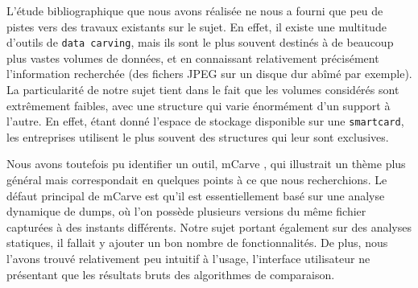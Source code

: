 L'étude bibliographique que nous avons réalisée ne nous a fourni que peu de pistes vers des travaux existants sur le sujet. En effet, il existe une multitude d'outils de \texttt{data carving}, mais ils sont le plus souvent destinés à de beaucoup plus vastes volumes de données, et en connaissant relativement précisément l'information recherchée (des fichers JPEG sur un disque dur abîmé par exemple). La particularité de notre sujet tient dans le fait que les volumes considérés sont extrêmement faibles, avec une structure qui varie énormément d'un support à l'autre. En effet, étant donné l'espace de stockage disponible sur une \texttt{smartcard}, les entreprises utilisent le plus souvent des structures qui leur sont exclusives.

Nous avons toutefois pu identifier un outil, mCarve \cite{mCarve}, qui illustrait un thème plus général mais correspondait en quelques points à ce que nous recherchions. Le défaut principal de mCarve est qu'il est essentiellement basé sur une analyse dynamique de dumps, où l'on possède plusieurs versions du même fichier capturées à des instants différents. Notre sujet portant également sur des analyses statiques, il fallait y ajouter un bon nombre de fonctionnalités. De plus, nous l'avons trouvé relativement peu intuitif à l'usage, l'interface utilisateur ne présentant que les résultats bruts des algorithmes de comparaison.

